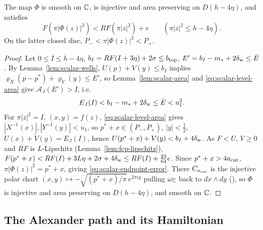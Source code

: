 \begin{lemma}\label{lem:scalar-endpoint}
The map $\Phi$ is smooth on $\mathbb{C}$, is injective and area preserving on $D(h-4\eta)$, and satisfies
\begin{equation}\label{eq:scalar-endpoint-error}
 F(\pi|\Phi(z)|^2)<RF(\pi|z|^2)+e\qquad(\pi|z|^2\le h-4\eta).
\end{equation}
On the latter closed disc, $P_-<\pi|\Phi(z)|^2<P_+$.
{\normalfont {}}
\end{lemma}

\begin{proof}
Let $0\le I\le h-4\eta$, $b_I=RF(I+3\eta)+2\sigma\le b_{\rm top}$, $E'=b_I-m_*+2\delta_{\rm w}\le\bar E$. By Lemma~\ref{lem:scalar-wells}, $U(p)+V(y)\le b_I$ implies $\varrho_X(p-p^*)+\varrho_Y(y)\le E'$, so Lemma~\ref{lem:scalar-area} and \eqref{eq:scalar-level-area} give $\mathcal A_J(E')>I$, i.e.
\begin{equation}\label{eq:scalar-energy-error}
 E_J(I)<b_I-m_*+2\delta_{\rm w}\le\bar E<u_1^2.
\end{equation}
For $\pi|z|^2=I$, $(x,y)=f(z)$, \eqref{eq:scalar-level-area} gives $|X^{-1}(x)|,|Y^{-1}(y)|<u_1$, so $p^*+x\in(P_-,P_+)$, $|y|<\frac12$, $\widetilde U(x)+\widetilde V(y)=E_J(I)$, hence $U(p^*+x)+V(y)<b_I+4\delta_{\rm w}$. As $F<U$, $V\ge0$ and $RF$ is $L$-Lipschitz (Lemma~\ref{lem:fcp-lipschitz}), $F(p^*+x)<RF(I)+3L\eta+2\sigma+4\delta_{\rm w}\le RF(I)+\tfrac{23}{64}e$. Since $p^*+x>4a_{\rm cut}$, $\pi|\Phi(z)|^2=p^*+x$, giving \eqref{eq:scalar-endpoint-error}. There $C_{a_{\rm cut}}$ is the injective polar chart $(x,y)\mapsto-\sqrt{(p^*+x)/\pi}\,e^{2\pi iy}$ pulling $\omega_{\mathbb{C}}$ back to $dx\wedge dy$ (), so $\Phi$ is injective and area preserving on $D(h-4\eta)$, and smooth on $\mathbb{C}$.
\end{proof}

\subsection{The Alexander path and its Hamiltonian}\label{sec:scalar-isotopy}


